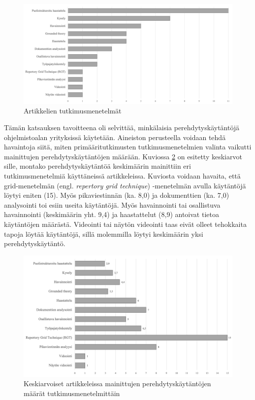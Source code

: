 \documentclass[utf8]{gradu3}
\begin{document}
\begin{figure}[h]
    \centering
    \includegraphics[width=\textwidth]{media/menetelmat.png}
    \caption{Artikkelien tutkimusmenetelmät}
    \label{kuvio:tutkimusmenetelmat}
\end{figure}

Tämän katsauksen tavoitteena oli selvittää, minkälaisia perehdytyskäytäntöjä ohjelmistoalan yrityksissä käytetään. Aineiston perusteella voidaan tehdä havaintoja siitä, miten primääritutkimusten tutkimusmenetelmien valinta vaikutti mainittujen perehdytyskäytäntöjen määrään. Kuviossa \ref{kuvio:menetelmilla-havaitut-kaytannot} on esitetty keskiarvot sille, montako perehdytyskäytäntöä keskimäärin mainittiin eri tutkimusmenetelmiä käyttäneissä artikkeleissa. Kuviosta voidaan havaita, että grid-menetelmän (engl. \textit{repertory grid technique}) -menetelmän avulla käytäntöjä löytyi eniten (15). Myös pikaviestinnän (ka. 8,0) ja dokumenttien (ka. 7,0) analysointi toi esiin useita käytäntöjä. Myös havainnointi tai osallistuva havainnointi (keskimäärin yht. 9,4) ja haastattelut (8,9) antoivat tietoa käytäntöjen määrästä. Videointi tai näytön videointi taas eivät olleet tehokkaita tapoja löytää käytäntöjä, sillä molemmilla löytyi keskimäärin yksi perehdytyskäytäntö.

\begin{figure}[h]
    \centering
    \includegraphics[width=\textwidth]{media/menetelmilla-havaitut-kaytannot.png}
    \caption{Keskiarvoiset artikkeleissa mainittujen perehdytyskäytäntöjen määrät tutkimusmenetelmittäin}
    \label{kuvio:menetelmilla-havaitut-kaytannot}
\end{figure}
\end{document}
